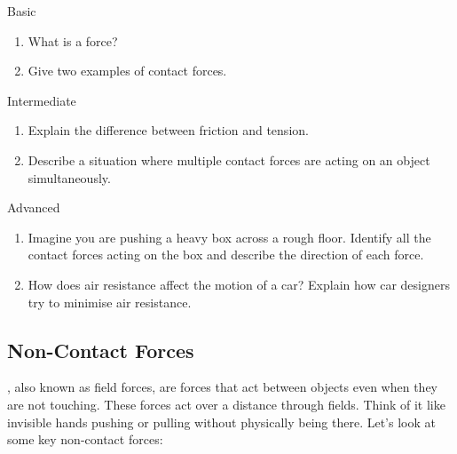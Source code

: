\begin{tieredquestions}{Basic}
\begin{enumerate}
    \item What is a force?
    \item Give two examples of contact forces.
\end{enumerate}
\end{tieredquestions}

\begin{tieredquestions}{Intermediate}
\begin{enumerate}
    \item Explain the difference between friction and tension.
    \item Describe a situation where multiple contact forces are acting on an object simultaneously.
\end{enumerate}
\end{tieredquestions}

\begin{tieredquestions}{Advanced}
\begin{enumerate}
    \item  Imagine you are pushing a heavy box across a rough floor. Identify all the contact forces acting on the box and describe the direction of each force.
    \item How does air resistance affect the motion of a car?  Explain how car designers try to minimise air resistance.
\end{enumerate}
\end{tieredquestions}


\subsection{Non-Contact Forces}

\begin{marginnote}
\end{marginnote}
, also known as field forces, are forces that act between objects even when they are not touching.  These forces act over a distance through fields.  Think of it like invisible hands pushing or pulling without physically being there.  Let's look at some key non-contact forces:

